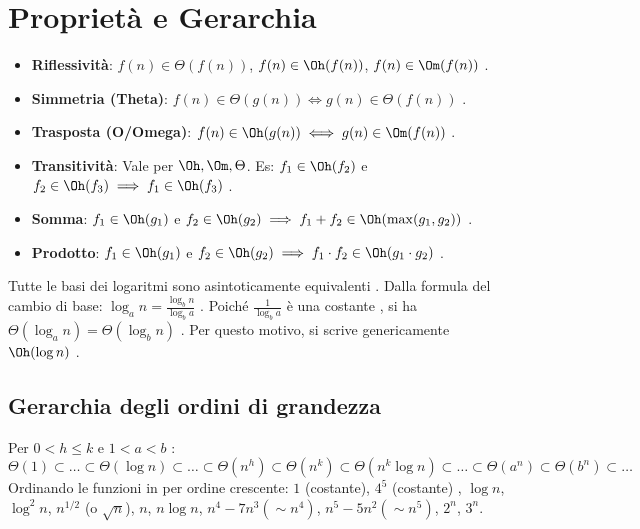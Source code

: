\section{Proprietà e Gerarchia}
\begin{observation}
\begin{itemize}
    \item \textbf{Riflessività}: $f(n) \in \Theta(f(n))$, $f(n) \in \Oh(f(n))$, $f(n) \in \Om(f(n))$ .
    \item \textbf{Simmetria (Theta)}: $f(n) \in \Theta(g(n)) \iff g(n) \in \Theta(f(n))$ .
    \item \textbf{Trasposta (O/Omega)}: $f(n) \in \Oh(g(n)) \iff g(n) \in \Om(f(n))$ .
    \item \textbf{Transitività}: Vale per $\Oh, \Om, \Theta$.
    Es: $f_1 \in \Oh(f_2)$ e $f_2 \in \Oh(f_3) \implies f_1 \in \Oh(f_3)$ .
    \item \textbf{Somma}: $f_1 \in \Oh(g_1)$ e $f_2 \in \Oh(g_2) \implies f_1+f_2 \in \Oh(\max(g_1, g_2))$ .
    \item \textbf{Prodotto}: $f_1 \in \Oh(g_1)$ e $f_2 \in \Oh(g_2) \implies f_1 \cdot f_2 \in \Oh(g_1 \cdot g_2)$ .
\end{itemize}
\end{observation}


\begin{observation}
Tutte le basi dei logaritmi sono asintoticamente equivalenti .
Dalla formula del cambio di base: $\log_a n = \frac{\log_b n}{\log_b a}$ .
Poiché $\frac{1}{\log_b a}$ è una costante , si ha $\Theta(\log_a n) = \Theta(\log_b n)$ .
Per questo motivo, si scrive genericamente $\Oh(\log n)$ .
\end{observation}

\subsection{Gerarchia degli ordini di grandezza }

\begin{example}
Per $0 < h \le k$ e $1 < a < b$ :
$$ \Theta(1) \subset \dots \subset \Theta(\log n) \subset \dots \subset \Theta(n^h) \subset \Theta(n^k) \subset \Theta(n^k \log n) \subset \dots \subset \Theta(a^n) \subset \Theta(b^n) \subset \dots $$
Ordinando le funzioni in per ordine crescente:
$1$ (costante), $4^5$ (costante) , $\log n$, $\log^2 n$, $n^{1/2}$ (o $\sqrt{n}$), $n$, $n \log n$, $n^4 - 7n^3 (\sim n^4)$, $n^5 - 5n^2 (\sim n^5)$, $2^n$, $3^n$.
\end{example}